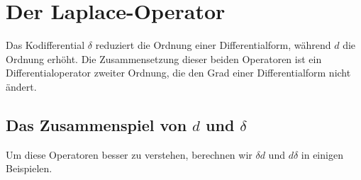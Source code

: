 %
%
%
\section{Der Laplace-Operator}
Das Kodifferential $\delta$ reduziert die Ordnung einer Differentialform,
während $d$ die Ordnung erhöht.
Die Zusammensetzung dieser beiden Operatoren ist ein Differentialoperator
zweiter Ordnung, die den Grad einer Differentialform nicht ändert.

%
%
\subsection{Das Zusammenspiel von $d$ und $\delta$}
Um diese Operatoren besser zu verstehen, berechnen wir $\delta d$ und
$d\delta$ in einigen Beispielen.

